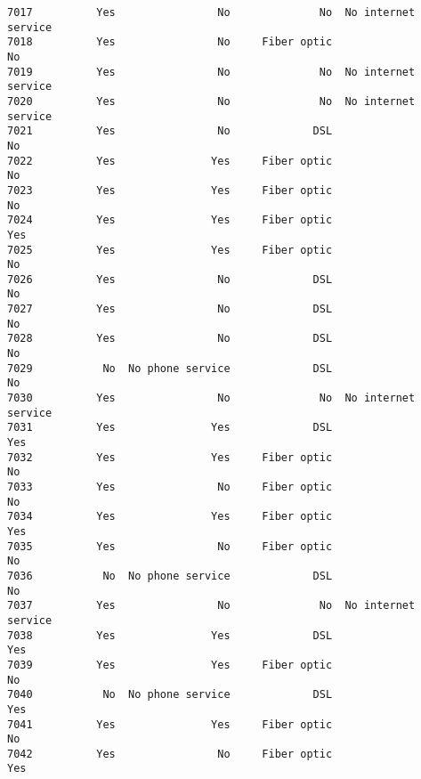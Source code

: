 \documentclass[11pt]{article}
\begin{document}
\begin{tcolorbox}[breakable, boxrule=.5pt, size=fbox, pad at break*=1mm, opacityfill=0]
\begin{Verbatim}[commandchars=\\\{\}]
7017          Yes                No              No  No internet service
7018          Yes                No     Fiber optic                   No
7019          Yes                No              No  No internet service
7020          Yes                No              No  No internet service
7021          Yes                No             DSL                   No
7022          Yes               Yes     Fiber optic                   No
7023          Yes               Yes     Fiber optic                   No
7024          Yes               Yes     Fiber optic                  Yes
7025          Yes               Yes     Fiber optic                   No
7026          Yes                No             DSL                   No
7027          Yes                No             DSL                   No
7028          Yes                No             DSL                   No
7029           No  No phone service             DSL                   No
7030          Yes                No              No  No internet service
7031          Yes               Yes             DSL                  Yes
7032          Yes               Yes     Fiber optic                   No
7033          Yes                No     Fiber optic                   No
7034          Yes               Yes     Fiber optic                  Yes
7035          Yes                No     Fiber optic                   No
7036           No  No phone service             DSL                   No
7037          Yes                No              No  No internet service
7038          Yes               Yes             DSL                  Yes
7039          Yes               Yes     Fiber optic                   No
7040           No  No phone service             DSL                  Yes
7041          Yes               Yes     Fiber optic                   No
7042          Yes                No     Fiber optic                  Yes


\end{Verbatim}
\end{tcolorbox}
\end{document}
